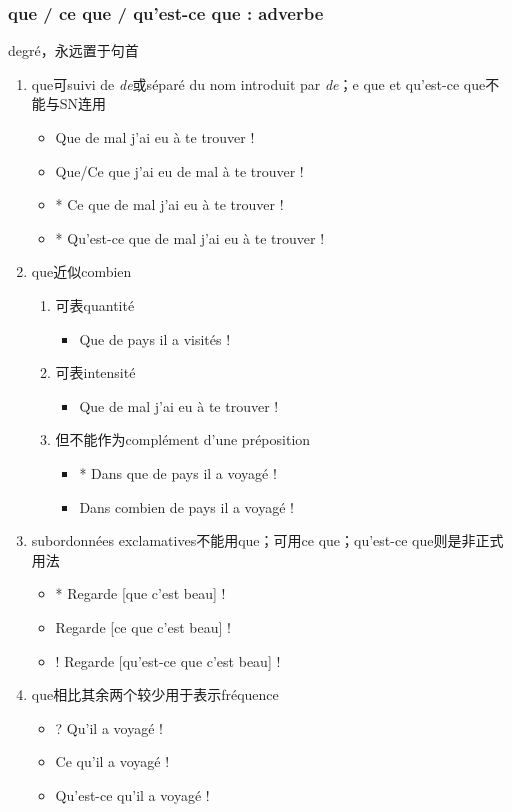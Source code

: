 \documentclass[UTF8]{report}
\begin{document}
\subsubsection{que / ce que / qu’est-ce que : adverbe}
degré，永远置于句首
\begin{enumerate}
    \item que可suivi de \textit{de}或séparé du nom introduit par \textit{de}；e que et qu’est-ce que不能与SN连用
    \begin{itemize}
        \item Que de mal j’ai eu à te trouver !
        \item Que/Ce que j’ai eu de mal à te trouver !
        \item * Ce que de mal j’ai eu à te trouver !
        \item * Qu’est-ce que de mal j’ai eu à te trouver !
    \end{itemize}
    \item que近似combien
    \begin{enumerate}
        \item 可表quantité
        \begin{itemize}
            \item Que de pays il a visités !
        \end{itemize}
        \item 可表intensité
        \begin{itemize}
            \item Que de mal j’ai eu à te trouver !
        \end{itemize}
        \item 但不能作为complément d’une préposition
        \begin{itemize}
            \item * Dans que de pays il a voyagé !
            \item Dans combien de pays il a voyagé !
        \end{itemize}
    \end{enumerate}
    \item subordonnées exclamatives不能用que；可用ce que；qu’est-ce que则是非正式用法
    \begin{itemize}
        \item * Regarde [que c’est beau] !
        \item Regarde [ce que c’est beau] !
        \item ! Regarde [qu’est-ce que c’est beau] !
    \end{itemize}
    \item que相比其余两个较少用于表示fréquence
    \begin{itemize}
        \item ? Qu’il a voyagé !
        \item Ce qu’il a voyagé !
        \item Qu’est-ce qu’il a voyagé !
    \end{itemize}
\end{enumerate}
\end{document}
